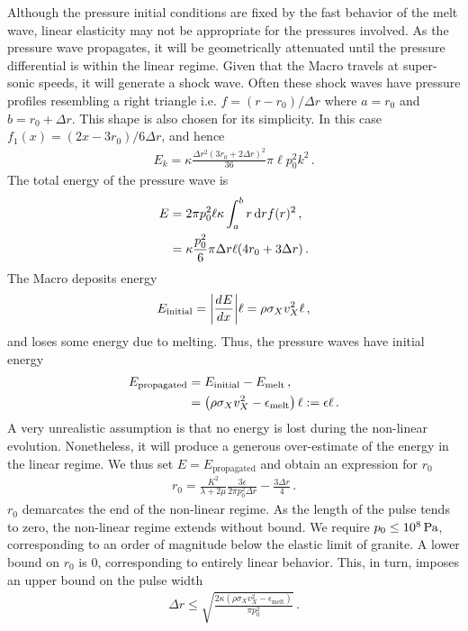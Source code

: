 \documentclass[prd,reprint,10pt,tightenlines]{revtex4-1}
\newcommand*\diff{\mathop{}\!\mathrm{d}}
\newcommand*\te[1]{\text{#1}}
\newcommand*\p[1]{\left(#1\right)}
\newcommand*\f[2]{\frac{#1}{#2}}
\newcommand*\td[3]{\frac{d^{#3}#1}{d #2^{#3}}}
\begin{document}
Although the pressure initial conditions are fixed by the fast behavior of the melt wave, linear elasticity may not be appropriate for the pressures involved. As the pressure wave propagates, it will be geometrically attenuated until the pressure differential is within the linear regime. Given that the Macro travels at super-sonic speeds, it will generate a shock wave. Often these shock waves have pressure profiles resembling a right triangle i.e. $f = \p{r - r_0}/\Delta r$ where $a = r_0$ and $b = r_0 + \Delta r$. This shape is also chosen for its simplicity. In this case $f_1(x) = \p{2 x-3r_0}/6\Delta r$, and hence
\begin{align}
E_k = \kappa \f{\Delta r^2(3r_0+2\Delta r)^2}{36} \pi\ell p_0^2k^2\,.
\end{align}
The total energy of the pressure wave is
\begin{align}
E \notag&= 2\pi p_0^2\ell\kappa\int_a^b r\diff r f(r)^2\,,\\
&=\kappa\f{p_0^2}{6}\pi\Delta r \ell(4r_0 + 3\Delta r)\,.
\end{align}
The Macro deposits energy
\begin{align}
E_\te{initial} = \abs{\td{E}{x}{}}\ell = \rho\sigma_X v_X^2\ell\,,
\end{align}
and loses some energy due to melting. Thus, the pressure waves have initial energy
\begin{align}
E_\te{propagated} \notag&= E_\te{initial} - E_\te{melt}\,,\\
&= \p{\rho\sigma_X v_X^2 - \epsilon_\te{melt}}\ell:=\epsilon\ell\,.
\end{align}
A very unrealistic assumption is that no energy is lost during the non-linear evolution. Nonetheless, it will produce a generous over-estimate of the energy in the linear regime. We thus set $E = E_\te{propagated}$ and obtain an expression for $r_0$
\begin{align}
r_0 = \f{K^2}{\lambda+2\mu}\f{3\epsilon}{2\pi p_0^2\Delta r}-\f{3\Delta r}{4}\,.
\end{align}
$r_0$ demarcates the end of the non-linear regime. As the length of the pulse tends to zero, the non-linear regime extends without bound. We require $p_0\leq 10^8\te{\,Pa}$, corresponding to an order of magnitude below the elastic limit of granite. A lower bound on $r_0$ is 0, corresponding to entirely linear behavior. This, in turn, imposes an upper bound on the pulse width
\begin{align}
\Delta r\leq\sqrt{\f{2\kappa \p{\rho\sigma_X v_X^2 - \epsilon_\te{melt}}}{\pi p_0^2}}\,.
\end{align}
\end{document}

